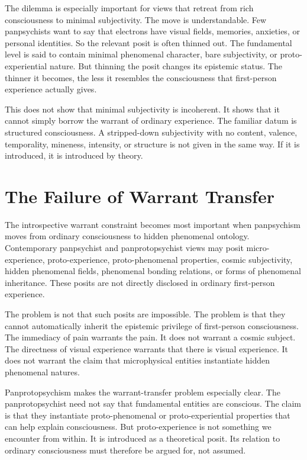 \documentclass[12pt]{article}
\begin{document}
The dilemma is especially important for views that retreat from rich consciousness to minimal subjectivity. The move is understandable. Few panpsychists want to say that electrons have visual fields, memories, anxieties, or personal identities. So the relevant posit is often thinned out. The fundamental level is said to contain minimal phenomenal character, bare subjectivity, or proto-experiential nature. But thinning the posit changes its epistemic status. The thinner it becomes, the less it resembles the consciousness that first-person experience actually gives.

This does not show that minimal subjectivity is incoherent. It shows that it cannot simply borrow the warrant of ordinary experience. The familiar datum is structured consciousness. A stripped-down subjectivity with no content, valence, temporality, mineness, intensity, or structure is not given in the same way. If it is introduced, it is introduced by theory.

\section{The Failure of Warrant Transfer}

The introspective warrant constraint becomes most important when panpsychism moves from ordinary consciousness to hidden phenomenal ontology. Contemporary panpsychist and panprotopsychist views may posit micro-experience, proto-experience, proto-phenomenal properties, cosmic subjectivity, hidden phenomenal fields, phenomenal bonding relations, or forms of phenomenal inheritance. These posits are not directly disclosed in ordinary first-person experience.

The problem is not that such posits are impossible. The problem is that they cannot automatically inherit the epistemic privilege of first-person consciousness. The immediacy of pain warrants the pain. It does not warrant a cosmic subject. The directness of visual experience warrants that there is visual experience. It does not warrant the claim that microphysical entities instantiate hidden phenomenal natures.

Panprotopsychism makes the warrant-transfer problem especially clear. The panprotopsychist need not say that fundamental entities are conscious. The claim is that they instantiate proto-phenomenal or proto-experiential properties that can help explain consciousness. But proto-experience is not something we encounter from within. It is introduced as a theoretical posit. Its relation to ordinary consciousness must therefore be argued for, not assumed.
\end{document}
